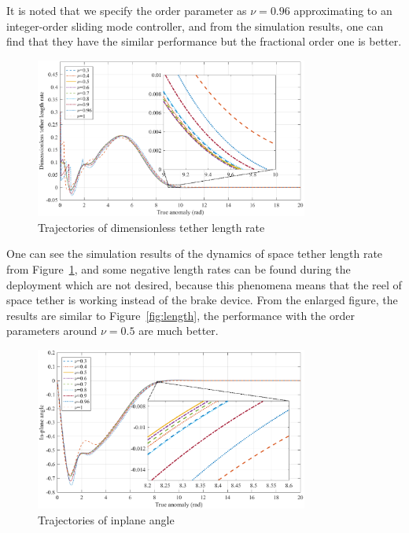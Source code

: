 \documentclass[ShortAfour]{sage}
\theoremstyle{plain}
\theoremstyle{remark}
\begin{document}
  It is noted that we specify the order parameter as $\nu=0.96$ approximating to an integer-order sliding mode controller, and from the simulation results, one can find that they have the similar performance but the fractional order one is better.
  \begin{figure}[hbtp]
    \centering
    \includegraphics[width=0.8\textwidth]{p9_length_rate.eps}
    \caption{Trajectories of dimensionless tether length rate}
    \label{fig:length rate}
    \end{figure} 

One can see the simulation results of the dynamics of space tether length rate from Figure~\ref{fig:length rate}, and some negative length rates can be found during the deployment which are not desired, because this phenomena means that the reel of space tether is working instead of the brake device. From the enlarged figure, the results are similar to Figure~\ref{fig:length}, the performance with the order parameters around $\nu =0.5$ are much better. 
\begin{figure}[hbtp]
  \centering
  \includegraphics[width=0.8\textwidth]{p9_angle.eps}
  \caption{Trajectories of inplane angle}
  \label{fig:angle}
  \end{figure}
\end{document}
